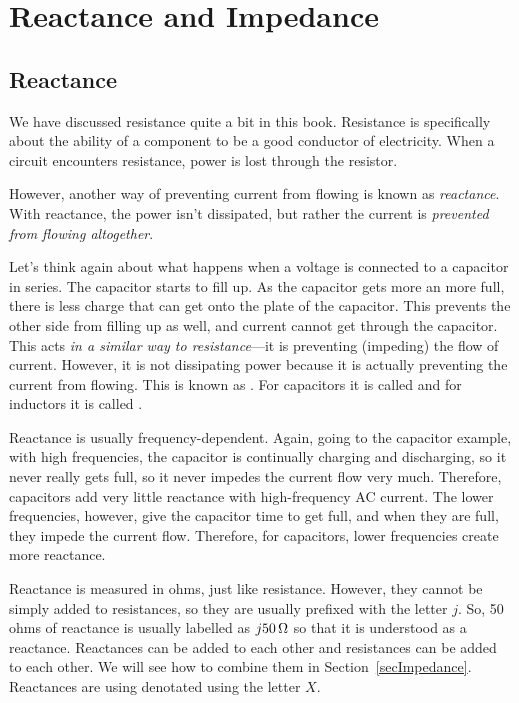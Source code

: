 \chapter{Reactance and Impedance}
\label{chapImpedance}


\section{Reactance}

We have discussed resistance quite a bit in this book.  
Resistance is specifically about the ability of a component to be a good conductor of electricity.
When a circuit encounters resistance, power is lost through the resistor.

However, another way of preventing current from flowing is known as \emph{reactance}.
With reactance, the power isn't dissipated, but rather the current is \emph{prevented from flowing altogether}.

Let's think again about what happens when a voltage is connected to a capacitor in series.
The capacitor starts to fill up.
As the capacitor gets more an more full, there is less charge that can get onto the plate of the capacitor.
This prevents the other side from filling up as well, and current cannot get through the capacitor.
This acts \emph{in a similar way to resistance}---it is preventing (impeding) the flow of current.
However, it is not dissipating power because it is actually preventing the current from flowing.
This is known as .
For capacitors it is called  and for inductors it is called .

Reactance is usually frequency-dependent.
Again, going to the capacitor example, with high frequencies, the capacitor is continually charging and discharging, so it never really gets full, so it never impedes the current flow very much.
Therefore, capacitors add very little reactance with high-frequency AC current.
The lower frequencies, however, give the capacitor time to get full, and when they are full, they impede the current flow.
Therefore, for capacitors, lower frequencies create more reactance.

Reactance is measured in ohms, just like resistance.  
However, they cannot be simply added to resistances, so they are usually prefixed with the letter $j$.
So, 50 ohms of reactance is usually labelled as $j50\,\si{\ohm}$ so that it is understood as a reactance.
Reactances can be added to each other and resistances can be added to each other.
We will see how to combine them in Section~\ref{secImpedance}.
Reactances are using denotated using the letter $X$.

